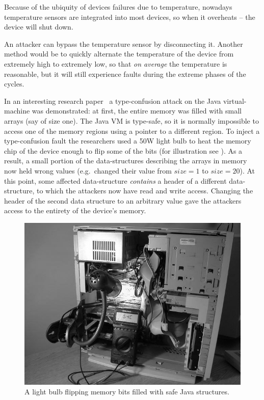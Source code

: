Because of the ubiquity of devices failures due to temperature, nowadays temperature sensors are integrated into most devices, so when it overheats -- the device will shut down.

An attacker can bypass the temperature sensor by disconnecting it. Another method would be to quickly alternate the temperature of the device from extremely high to extremely low, so that \emph{on average} the temperature is reasonable, but it will still experience faults during the extreme phases of the cycles.

In an interesting research paper~\cite{appel} a type-confusion attack on the 
Java virtual-machine was demonstrated: at first, the entire memory was filled 
with small arrays (say of size one). The Java VM is type-safe, so it is 
normally impossible to access one of the memory regions using a pointer to a 
different region. To inject a type-confusion fault the researchers used a 50W 
light bulb to heat the memory chip of the device enough to flip some of the 
bits (for illustration see ). As a result, a small 
portion of the data-structures describing the arrays in memory now held wrong 
values (e.g.\ changed their value from \(size=1\) to \(size=20\)). At this point, 
some affected data-structure \emph{contains} a header of a different 
data-structure, to which the attackers now have read and write access. Changing 
the header of the second data structure to an arbitrary value gave the 
attackers access to the entirety of the device's memory.

\begin{figure}[!ht]
	\centering
	\includegraphics[width=0.7\linewidth]{images/chapter_9/bulb.png}
	\caption{A light bulb flipping memory bits filled with safe Java structures.}\label{fig:memory_lightbulb}
\end{figure}

